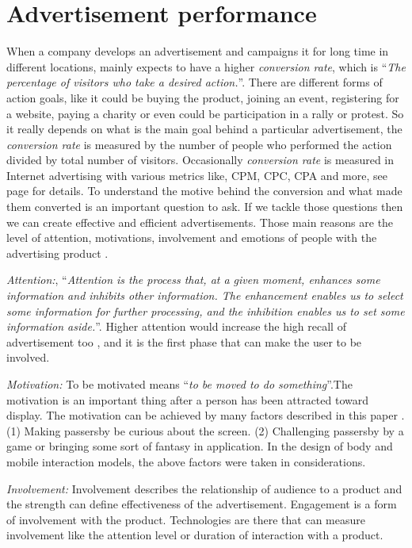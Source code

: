\section{Advertisement performance}
When a company develops an advertisement and campaigns it for long time in different locations, mainly expects to have a higher \emph{conversion rate}, which is ``\emph{The percentage of visitors who take a desired action.}''\cite{convrate}. There are different forms of action goals, like it could be buying the product, joining an event, registering for a website, paying a charity or even could be participation in a rally or protest. So it really depends on what is the main goal behind a particular advertisement, the \emph{conversion rate} is measured by the number of people who performed the action divided by total number of visitors. Occasionally \emph{conversion rate} is measured in Internet advertising with various metrics like, CPM, CPC, CPA and more, see page \pageref{adperformancebackground} for details. To understand the motive behind the conversion and what made them converted is an important question to ask. If we tackle those questions then we can create effective and efficient advertisements. Those main reasons are the level of attention, motivations, involvement and emotions of people with the advertising product \cite{pervasiv_ad}.

\emph{Attention:}, ``\emph{Attention is the process that, at a given moment, enhances some information and inhibits other information. The enhancement enables us to select some information for further processing, and the inhibition enables us to set some information aside.}''\cite{Attention}. Higher attention would increase the high recall of advertisement too \cite{add_effectivenss}, and it is the first phase that can make the user to be involved.

\emph{Motivation:}
To be motivated means ``\emph{to be moved to do something}''\cite{motiv}.The motivation is an important thing after a person has been attracted toward display. The motivation can be achieved by many factors described in this paper \cite{toward_motivation}. (1) Making passersby be curious about the screen. (2) Challenging passersby by a game or bringing some sort of fantasy in application. In the design of body and mobile interaction models, the above factors were taken in considerations. 

\emph{Involvement:} Involvement describes the relationship of audience to a product and the strength can define effectiveness of the advertisement. Engagement is a form of involvement with the product. Technologies are there that can measure involvement like the attention level or duration of interaction with a product.

